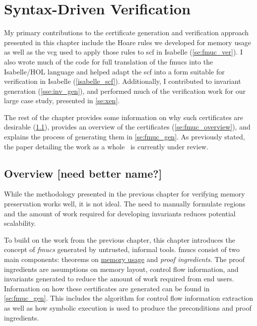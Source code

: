 \chapter{Syntax-Driven Verification}\label{ch:syntax}


My primary contributions to the certificate generation and verification approach%
presented in this chapter include the Hoare rules we developed
for memory usage as well as the \ac{vcg} used to apply those rules
to \ac{scf} in Isabelle (\cref{se:fmuc_ver}).
I also wrote much of the code for full translation of the \acp{fmuc}
into the Isabelle/HOL language
and helped adapt the \ac{scf} into a form suitable for verification
in Isabelle (\cref{isabelle_scf}).
Additionally, I contributed to invariant generation (\cref{sse:inv_gen}),
and performed much of the verification work for our large case study,
presented in \cref{se:xen}.

The rest of the chapter provides some information
on why such certificates are desirable (\cref{se:fmuc_motivation}),
provides an overview of the certificates (\cref{se:fmuc_overview}),
and explains the process of generating them in \cref{se:fmuc_gen}.
As previously stated,
the paper detailing the work as a whole~\citep{popl2019underreview}
is currently under review.

\section{Overview [need better name?]}\label{se:fmuc_motivation}
While the methodology presented in the previous chapter
for verifying memory preservation works well, it is not ideal.
The need to manually formulate regions
and the amount of work required for developing invariants
reduces potential scalability.

To build on the work from the previous chapter,
this chapter introduces the concept of \emph{\acfp{fmuc}}
generated by untrusted, informal tools.
\Acp{fmuc} consist of two main components:
theorems on \hyperref[memory_usage]{memory usage} and \emph{proof ingredients}.%
The proof ingredients are assumptions on memory layout,
control flow information, and invariants
generated to reduce the amount of work required from end users.
Information on how these certificates are generated
can be found in \cref{se:fmuc_gen}.
This includes the algorithm for control flow information extraction
as well as how symbolic execution is used
to produce the preconditions and proof ingredients.

